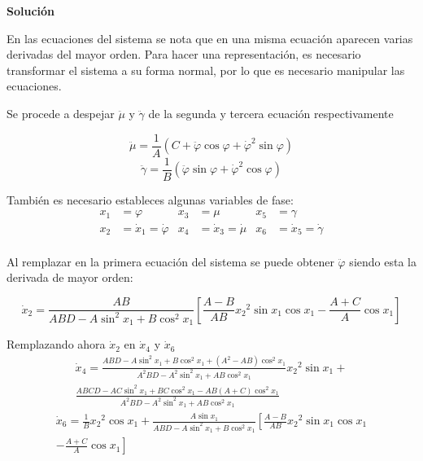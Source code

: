 \documentclass[letterpaper, 12pt]{article}
\begin{document}
\begin{enumerate}
\begin{enumerate}
\textbf{Solución}

En las ecuaciones del sistema se nota que en una misma ecuación aparecen varias derivadas del mayor orden. Para hacer una representación, es necesario transformar el sistema a su forma normal, por lo que es necesario manipular las ecuaciones.

Se procede a despejar $\ddot{\mu}$ y $\ddot{\gamma}$ de la segunda y tercera ecuación respectivamente

\begin{equation*}
    \ddot{\mu} = \frac{1}{A}\left(C + \ddot{\varphi}\cos \varphi + {\dot{\varphi}}^2\sin\varphi\right)
\end{equation*}
\begin{equation*}
    \ddot{\gamma} = \frac{1}{B}\left( \ddot{\varphi}\sin\varphi + {\dot{\varphi}}^2\cos\varphi \right)
\end{equation*}

También es necesario estableces algunas variables de fase:
\begin{align*}
    x_1 &= \varphi & x_3 &= \mu & x_5 &= \gamma \\
    x_2 &= \dot{x}_1 = \dot{\varphi} & x_4 &= \dot{x}_3 = \dot{\mu} & x_6 &= \dot{x}_5 = \dot{\gamma} \\
\end{align*}

Al remplazar en la primera ecuación del sistema se puede obtener $\ddot{\varphi}$ siendo esta la derivada de mayor orden:

\begin{equation}
    \dot{x}_2 = \frac{AB}{ABD - A\sin^2 x_1 + B\cos^2 x_1} \left[ \frac{A-B}{AB}{x_2}^2\sin x_1\cos x_1 -\frac{A+C}{A}\cos x_1\right]
\end{equation}

Remplazando ahora $\dot{x}_2$ en $\dot{x}_4$ y $\dot{x}_6$
\begin{multline}
    \dot{x}_4 = \frac{ABD - A\sin^2 x_1 + B\cos^2 x_1 + (A^2-AB)\cos^2 x_1}{A^2BD-A^2\sin^2 x_1 + AB\cos^2 x_1} {x_2}^2\sin x_1 + \\
    \frac{ABCD - AC\sin^2 x_1 + BC\cos^2 x_1 - AB(A+C)\cos^2 x_1}{A^2BD - A^2\sin^2 x_1 + AB\cos^2 x_1}
\end{multline}
\begin{multline}
    \dot{x}_6 = \frac{1}{B}{x_2}^2\cos x_1 + \frac{A\sin x_1}{ABD-A\sin^2 x_1 + B\cos^2 x_1} \left[\frac{A-B}{AB}{x_2}^2\sin x_1\cos x_1 \right.\\ \left.-\frac{A+C}{A}\cos x_1 \right]
\end{multline}


\end{enumerate}
\end{enumerate}
\end{document}

